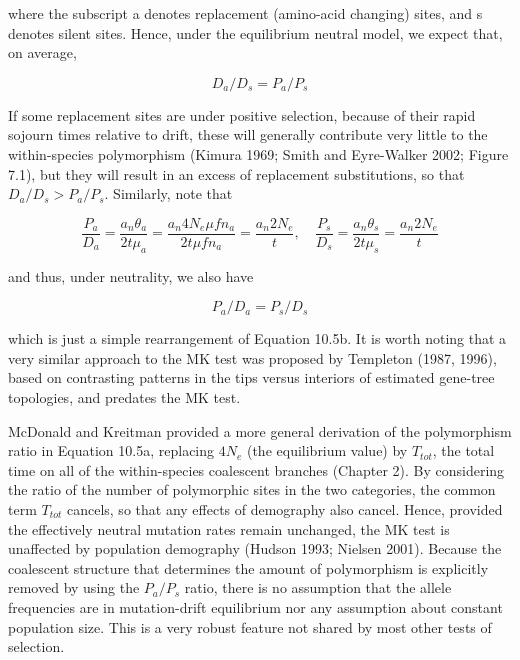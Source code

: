 \documentclass{article}
\begin{document}
where the subscript a denotes replacement (amino-acid changing) sites, and s denotes silent sites. Hence, under the equilibrium neutral model, we expect that, on average,

\begin{equation}
D_{a}/D_{s}=P_{a}/P_{s}
\tag{10.5b}
\label{eq:10_5b}
\end{equation}

If some replacement sites are under positive selection, because of their rapid sojourn times relative to drift, these will generally contribute very little to the within-species polymorphism (Kimura 1969; Smith and Eyre-Walker 2002; Figure 7.1), but they will result in an excess of replacement substitutions, so that  $ D_a/D_s > P_a/P_s $. Similarly, note that

\begin{equation}
\frac{P_{a}}{D_{a}}=\frac{a_{n}\theta_{a}}{2t\mu_{a}}=\frac{a_{n}4N_{e}\mu f n_{a}}{2t\mu f n_{a}}=\frac{a_{n}2N_{e}}{t},\quad\frac{P_{s}}{D_{s}}=\frac{a_{n}\theta_{s}}{2t\mu_{s}}=\frac{a_{n}2N_{e}}{t}
\tag{10.5c}
\label{eq:10_5c}
\end{equation}

and thus, under neutrality, we also have

\begin{equation}
P_{a}/D_{a}=P_{s}/D_{s}
\tag{10.5d}
\label{eq:10_5d}
\end{equation}

which is just a simple rearrangement of Equation 10.5b. It is worth noting that a very similar approach to the MK test was proposed by Templeton (1987, 1996), based on contrasting patterns in the tips versus interiors of estimated gene-tree topologies, and predates the MK test.

McDonald and Kreitman provided a more general derivation of the polymorphism ratio in Equation 10.5a, replacing  $ 4N_e $ (the equilibrium value) by  $ T_{tot} $, the total time on all of the within-species coalescent branches (Chapter 2). By considering the ratio of the number of polymorphic sites in the two categories, the common term  $ T_{tot} $ cancels, so that any effects of demography also cancel. Hence, provided the effectively neutral mutation rates remain unchanged, the MK test is unaffected by population demography (Hudson 1993; Nielsen 2001). Because the coalescent structure that determines the amount of polymorphism is explicitly removed by using the  $ P_a / P_s $ ratio, there is no assumption that the allele frequencies are in mutation-drift equilibrium nor any assumption about constant population size. This is a very robust feature not shared by most other tests of selection.
\end{document}
